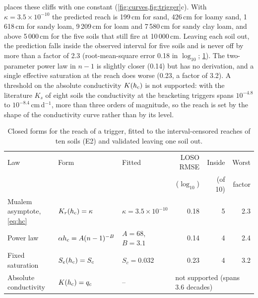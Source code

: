  places these cliffs with one constant (\cref{fig:curves,fig:trigger}c). With $\kappa=3.5\times10^{-10}$ the predicted reach is 199\,cm for sand, 426\,cm for loamy sand, 1\,618\,cm for sandy loam, 9\,209\,cm for loam and 7\,580\,cm for sandy clay loam, and above 5\,000\,cm for the five soils that still fire at 10\,000\,cm. Leaving each soil out, the prediction falls inside the observed interval for five soils and is never off by more than a factor of 2.3 (root-mean-square error 0.18 in $\log_{10}$; \cref{tab:laws}). The two-parameter power law in $n-1$ is slightly closer (0.14) but has no derivation, and a single effective saturation at the reach does worse (0.23, a factor of 3.2). A threshold on the absolute conductivity $K(h_{\mathrm{c}})$ is not supported: with the literature $K_s$ of eight soils the conductivity at the bracketing triggers spans $10^{-4.8}$ to $10^{-8.4}$\,cm\,d$^{-1}$, more than three orders of magnitude, so the reach is set by the shape of the conductivity curve rather than by its level.

\begin{table}[H]\centering\small
\caption{Closed forms for the reach of a trigger, fitted to the interval-censored reaches of ten soils (E2) and validated leaving one soil out.}
\label{tab:laws}
\footnotesize\begin{tabular}{@{}lllrrr@{}}
\toprule
Law & Form & Fitted & LOSO RMSE & Inside & Worst\\
 & & & ($\log_{10}$) & (of 10) & factor\\\midrule
Mualem asymptote, \cref{eq:hc} & $K_r(h_{\mathrm{c}})=\kappa$ & $\kappa=3.5\times10^{-10}$ & 0.18 & 5 & 2.3\\
Power law & $\alpha h_{\mathrm{c}}=A(n-1)^{-B}$ & $A=68$, $B=3.1$ & 0.14 & 4 & 2.4\\
Fixed saturation & $S_e(h_{\mathrm{c}})=S_c$ & $S_c=0.032$ & 0.23 & 4 & 3.2\\
Absolute conductivity & $K(h_{\mathrm{c}})=q_c$ & -- & \multicolumn{3}{l}{not supported (spans 3.6 decades)}\\\bottomrule
\end{tabular}
\end{table}

